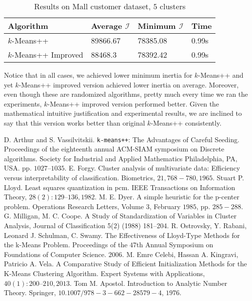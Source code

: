 \documentclass[twoside, 11pt]{article}
\newcommand{\I}{\mathcal{I}}
\begin{document}
		\begin{table}
			\begin{center}
				\begin{tabular}{|l|l|l|l|}
					\hline
					Algorithm & Average $\I$& Minimum $\I$& Time\\\hline
					$k$-Means++ & 89866.67& 78385.08& 0.99s\\\hline
					$k$-Means++ Improved& 88468.3& 78392.42& 0.99s\\\hline
				\end{tabular}
				\caption{Results on Mall customer dataset, $5$ clusters}
				\label{tbl:mall2}
			\end{center}
		\end{table}
	Notice that in all cases, we achieved lower minimum inertia for $k$-Means++ and yet $k$-Means++ improved version achieved lower inertia on average. Moreover, even though these are randomized algorithms, pretty much every time we ran the experiments, $k$-Means++ improved version performed better. Given the mathematical intuitive justification and experimental results, we are inclined to say that this version works better than original $k$-Means++ consistently.
	\begin{thebibliography}{99}
		 D. Arthur and S. Vassilvitskii. \texttt{k-means++}: The Advantages of Careful Seeding. Proceedings of the eighteenth annual ACM-SIAM symposium on Discrete algorithms. Society for Industrial and Applied Mathematics Philadelphia, PA, USA. pp. $1027–1035$.
		 E. Forgy. Cluster analysis of multivariate data: Efficiency versus interpretability of classification. Biometrics, $21, 768-780, 1965$.
		 Stuart P. Lloyd. Least squares quantization in pcm. IEEE Transactions on Information Theory, $28(2):129–136, 1982$.
		 M. E. Dyer. A simple heuristic for the p-center problem. Operations Research Letters, Volume $3$, February $1985$, pp. $285-288$.
		 G. Milligan, M. C. Coope. A Study of Standardization of Variables in Cluster Analysis, Journal of Classification 5(2) (1988) 181–204.
		 R. Ostrovsky, Y. Rabani, Leonard J. Schulman, C. Swamy. The Effectiveness of Lloyd-Type Methods for the k-Means Problem. Proceedings of the $47$th Annual Symposium on Foundations of Computer Science. $2006$.
		 M. Emre Celebi, Hassan A. Kingravi, Patricio A. Vela. A Comparative Study of Efficient Initialization Methods for the K-Means Clustering Algorithm. Expert Systems with Applications, $40(1): 200–210, 2013$.
		 Tom M. Apostol. Introduction to Analytic Number Theory. Springer, $10.1007/978-3-662-28579-4$, $1976$.
	\end{thebibliography}
\end{document}
